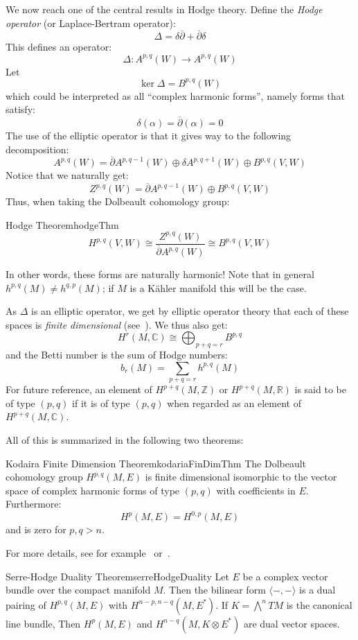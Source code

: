 \documentclass{book}
\newenvironment{Proof}[1][]
  {\begin{ProofTcb}[#1]}
  {\end{ProofTcb}}
\newcommand{\R}{{\mathbb{R}}}
\newcommand{\Z}{{\mathbb{Z}}}
\newcommand{\C}{{\mathbb{C}}}
\begin{document}
We now reach one of the central results in Hodge theory. Define the \emph{Hodge operator} (or Laplace-Bertram
operator):
\[
  \Delta = \delta\overline{\partial} + \overline{\partial}\delta
\]
This defines an operator:
\[
  \Delta: A^{p,q}(W) \to A^{p,q}(W)
\]
Let
\[
  \ker\Delta = B^{p,q}(W)
\]
which could be interpreted as all ``complex harmonic forms'', namely forms that satisfy:
\[
  \delta(\alpha) = \overline{\partial}(\alpha) = 0
\]
The use of the elliptic operator is that it gives way to the following decomposition:
\[
  A^{p,q}(W) = \overline{\partial}A^{p, q-1}(W) \oplus \delta A^{p, q+1}(W) \oplus B^{p,q}(V,W)
\]
Notice that we naturally get:
\[
  Z^{p,q}(W) = \overline{\partial}A^{p, q-1}(W) \oplus B^{p,q}(V,W)
\]
Thus, when taking the Dolbeault cohomology group:
\begin{thm}{Hodge Theorem}{hodgeThm}
  \[
  H^{p,q}(V,W) \cong \frac{Z^{p,q}(W)}{\overline{\partial}A^{p,q}(W)} \cong B^{p,q}(V,W)
\]
\end{thm}

In other words, these forms are naturally harmonic!
Note that in general $h^{p,q}(M) \ne h^{q,p}(M)$; if $M$ is a K\"ahler manifold this will be the case.

As $\Delta$ is an elliptic operator, we get by elliptic operator theory that each of these spaces is
\emph{finite dimensional} (see~\cite{HodgeTheory2014}). We thus also get:
\[
  H^r(M, \C) \cong \bigoplus_{p+q=r} B^{p,q}
\]
and the Betti number is the sum of Hodge numbers:
\[
  b_r(M) = \sum_{p+q=r} h^{p,q}(M)
\]
For future reference, an element of $H^{p+q}(M, \Z)$ or  $H^{p+q}(M, \R)$ is said to be of type $(p,q)$ if it
is of type $(p,q)$ when regarded as an element of $H^{p+q}(M, \C)$.

All of this is summarized in the following two theorems:

\begin{thm}{Kodaira Finite Dimension Theorem}{kodariaFinDimThm}
   The Dolbeault cohomology group $H^{p,q}(M,E)$ is finite dimensional
  isomorphic to the vector space of complex harmonic forms of type $(p,q)$ with coefficients in $E$.
  Furthermore:
  \[
    H^p(M,E) = H^{0,p}(M,E)
  \]
  and is zero for $p,q > n$.
\end{thm}

\begin{Proof}
  For more details, see for example~\cite{HodgeTheory2014} or~\cite{voisinHodgeTheoryComplex2002}.
\end{Proof}

\begin{thm}{Serre-Hodge Duality Theorem}{serreHodgeDuality}
  Let $E$ be a complex vector bundle over the compact manifold $M$. Then the bilinear form $\langle -,-
  \rangle$ is a dual pairing of $H^{p,q}(M,E)$ with $H^{n-p, n-q}(M, E^*)$. If $K = \bigwedge^n TM$ is the
  canonical line bundle, Then $H^p(M,E)$ and $H^{n-q}(M, K\otimes E^*)$ are dual vector spaces.
\end{thm}
\end{document}
